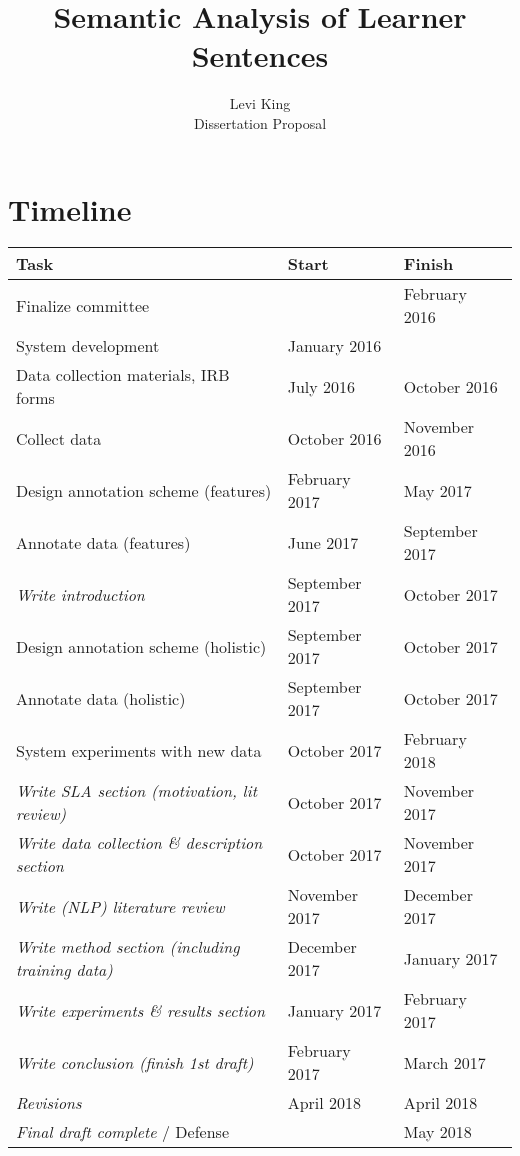 \documentclass[11pt]{article}
\title{Semantic Analysis of Learner Sentences}
\author{Levi King \\ Dissertation Proposal}
\begin{document}
\maketitle

\section{Timeline}
\begin{center}
\begin{tabular}{|l|l|l|}
  \hline
  \textbf{Task} & \textbf{Start} & \textbf{Finish} \\
  \hline
  \hline
  Finalize committee & & February 2016 \\
  \hline
  \hline
  System development & January 2016 &  \\
  \hline
  Data collection materials, IRB forms & July 2016 & October 2016 \\
  \hline
  Collect data & October 2016 & November 2016 \\
  \hline
  Design annotation scheme (features) & February 2017 & May 2017 \\
  \hline
  Annotate data (features) & June 2017 & September 2017 \\
  \hline
  \textit{Write introduction} & September 2017 & October 2017 \\
  \hline
  Design annotation scheme (holistic) & September 2017 & October 2017 \\
  \hline
  Annotate data (holistic) & September 2017 & October 2017 \\
  \hline
  System experiments with new data & October 2017 & February 2018 \\
  \hline
  \textit{Write SLA section (motivation, lit review)} & October 2017 & November 2017 \\
  \hline
  \textit{Write data collection \& description section} & October 2017 & November 2017 \\
  \hline
  \textit{Write (NLP) literature review} & November 2017 & December 2017 \\
  \hline
  \textit{Write method section (including training data)} & December 2017 & January 2017 \\
  \hline
  \textit{Write experiments \& results section} & January 2017 & February 2017 \\
  \hline
  \textit{Write conclusion (finish 1st draft)} & February 2017 & March 2017 \\
  \hline
  \textit{Revisions} & April 2018 & April 2018 \\
  \hline
  \textit{Final draft complete} / Defense & & May 2018 \\
  \hline
\end{tabular}
\end{center}
\end{document}
